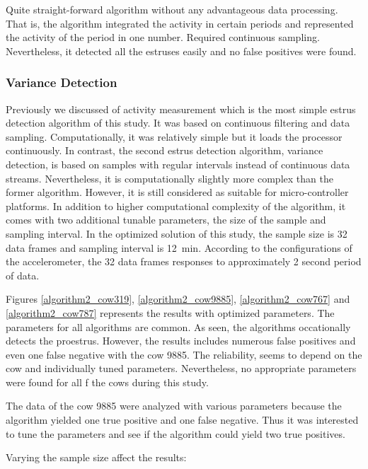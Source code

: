 \documentclass[english,12pt,a4paper,pdftex,elec,utf8]{aaltothesis}
\begin{document}
Quite straight-forward algorithm without any advantageous data processing. That is, the algorithm integrated the activity in certain periods and represented the activity of the period in one number. Required continuous sampling. Nevertheless, it detected all the estruses easily and no false positives were found. \\


\subsubsection{Variance Detection} \label{variancedetectionevaluation}




Previously we discussed of activity measurement which is the most simple estrus detection algorithm of this study. It was based on continuous filtering and data sampling. Computationally, it was relatively simple but it loads the processor continuously. In contrast, the second estrus detection algorithm, variance detection, is based on samples with regular intervals instead of continuous data streams. Nevertheless, it is computationally slightly more complex than the former algorithm. However, it is still considered as suitable for micro-controller platforms. In addition to higher computational complexity of the algorithm, it comes with two additional tunable parameters, the size of the sample and sampling interval. In the optimized solution of this study, the sample size is 32 data frames and sampling interval is \SI{12}{\minute}. According to the configurations of the accelerometer, the 32 data frames responses to approximately 2 second period of data. 

Figures \ref{algorithm2_cow319}, \ref{algorithm2_cow9885}, \ref{algorithm2_cow767} and \ref{algorithm2_cow787} represents the results with optimized parameters. The parameters for all algorithms are common. As seen, the algorithms occationally detects the proestrus. However, the results includes numerous false positives and even one false negative with the cow 9885. The reliability, seems to depend on the cow and individually tuned parameters. Nevertheless, no appropriate parameters were found for all f the cows during this study.

The data of the cow 9885 were analyzed with various parameters because the algorithm yielded one true positive and one false negative. Thus it was interested to tune the parameters and see if the algorithm could yield two true positives.


Varying the sample size affect the results:
\end{document}
